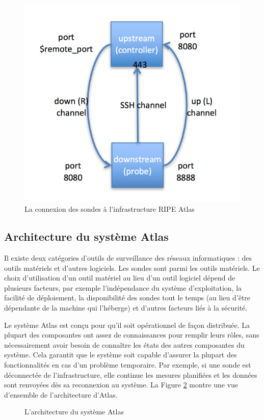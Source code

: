 \begin{figure}[H]
	\centering
	\captionsetup{justification=centering}
	\includegraphics[width=0.5\linewidth]{illustrations/ssh-atlas-probe}
	\caption{La connexion des sondes  à l'infrastructure RIPE Atlas \cite{how-we-manage-our-probe}}
	\label{fig:ssh-atlas-probe}
\end{figure}

\subsection{Architecture du système Atlas} \label{subsec:archi-probes}

Il existe deux catégories d'outils de surveillance des réseaux informatiques : des outils matériels et d'autres logiciels. Les sondes   sont parmi les outils matériels. Le choix d'utilisation d'un outil matériel au lieu d'un outil logiciel dépend de plusieurs facteurs, par exemple l'indépendance du système d'exploitation, la facilité de déploiement, la disponibilité des sondes tout le temps (au lieu d'être dépendante de la machine qui l'héberge) et d'autres facteurs liés à la sécurité.

Le système Atlas est conçu pour qu'il soit opérationnel de façon distribuée. La plupart des composantes ont assez de connaissances pour remplir leurs rôles, sans nécessairement avoir besoin de connaître les états des autres composantes du système. Cela garantit que le système soit capable d'assurer la plupart des fonctionnalités en cas  d'un problème temporaire. Par exemple, si une sonde est déconnectée de l'infrastructure, elle continue les mesures planifiées et les données sont renvoyées dès sa reconnexion au système.
La Figure  \ref{fig:archi-ripe-atlas} montre une vue d'ensemble de l'architecture d'Atlas.

\begin{figure}[H]
	\centering
	\resizebox{\textwidth}{!}{
		 
	}
	\caption{L'architecture du système  Atlas}
	\label{fig:archi-ripe-atlas}
\end{figure}

